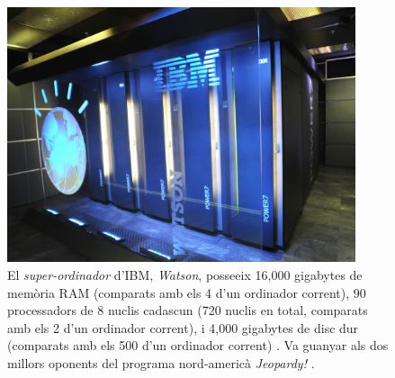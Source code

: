 \begin{figure}[ht!]
\centering
\includegraphics[height=75mm]{data/watson.jpg}
\caption{El \emph{super-ordinador} d'IBM, \emph{Watson}, posseeix 16,000 gigabytes de memòria RAM (comparats amb els 4 d'un ordinador corrent), 90 processadors de 8 nuclis cadascun (720 nuclis en total, comparats amb els 2 d'un ordinador corrent), i 4,000 gigabytes de disc dur (comparats amb els 500 d'un ordinador corrent) \cite{watsonspecs}. Va guanyar als dos millors oponents del programa nord-americà \emph{Jeopardy!} \cite{watsonjeopardy}.}
\label{watson}
\end{figure}
